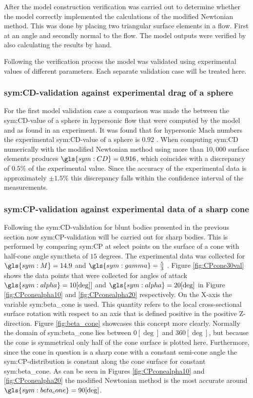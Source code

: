 After the model construction verification was carried out to determine whether the model correctly implemented the calculations of the modified Newtonian method. This was done by placing two triangular surface elements in a flow. First at an angle and secondly normal to the flow. The model outputs were verified by also calculating the results by hand.

Following the verification process the model was validated using experimental values of different parameters. Each separate validation case will be treated here.

\subsubsection{\gls{sym:CD}-validation against experimental drag of a sphere}
\label{subsubsec:valsphere}
For the first model validation case a comparison was made the between the \gls{sym:CD}-value of a sphere in hypersonic flow that were computed by the model and as found in an experiment. It was found that for hypersonic Mach numbers the experimental \gls{sym:CD}-value of a sphere is $0.92$ \cite{Bailey1966,AndersonJr.2007,Cox1965}. When computing \gls{sym:CD} numerically with the modified Newtonian method using more than $10,000$ surface elements produces $\gls{sym:CD}=0.916$, which coincides with a discrepancy of $0.5\%$ of the experimental value. Since the accuracy of the experimental data is approximately $\pm1.5\%$ \cite{Bailey1966} this discrepancy falls within the confidence interval of the measurements.

\subsubsection{\gls{sym:CP}-validation against experimental data of a sharp cone}
\label{subsubsec:valsharpconeCP}
Following the \gls{sym:CD}-validation for blunt bodies presented in the previous section now \gls{sym:CP}-validation will be carried out for sharp bodies. This is performed by comparing \gls{sym:CP} at select points on the surface of a cone with half-cone angle \gls{sym:theta} of $15$ degrees. The experimental data was collected for $\gls{sym:M}=14.9$ and $\gls{sym:gamma}=\frac{5}{3}$  \cite{Bertin1994,Cleary1970}. Figure \ref{fig:CPcone30val} shows the data points that were collected for angles of attack $\gls{sym:alpha}=10[\deg]]$ and $\gls{sym:alpha}=20[\deg]$ in Figure \ref{fig:CPconealpha10} and \ref{fig:CPconealpha20} respectively. On the X-axis the variable \gls{sym:beta_cone} is used. This quantity refers to the local cross-sectional surface rotation with respect to an axis that is defined positive in the positive Z-direction. Figure \ref{fig:beta_cone} showcases this concept more clearly. Normally the domain of \gls{sym:beta_cone} lies between $0[\deg]$ and $360[\deg]$, but because the cone is symmetrical only half of the cone surface is plotted here. Furthermore, since the cone in question is a sharp cone with a constant semi-cone angle the \gls{sym:CP}-distribution is constant along the cone surface for constant \gls{sym:beta_cone}.
As can be seen in Figures \ref{fig:CPconealpha10} and \ref{fig:CPconealpha20} the modified Newtonian method is the most accurate around $\gls{sym:beta_cone}=90[\deg]$.

